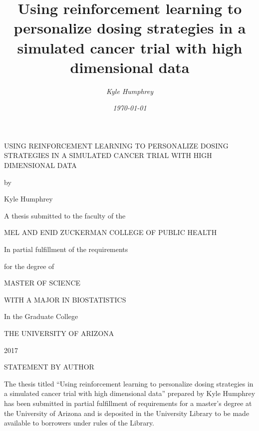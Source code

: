 \documentclass[12pt]{article}
\title{\normalfont \Large Using reinforcement learning to personalize dosing strategies in a simulated cancer trial with high dimensional data}
\author{\normalsize \sl Kyle Humphrey}
\date{\normalsize \sl \today}
\begin{document}
\begin{titlepage}
    \begin{center}
        \vspace*{1cm}
        
        \uppercase{Using reinforcement learning to personalize dosing strategies in a simulated cancer trial with high dimensional data}
        
        \vfill
        
        by
        
        \vfill
        
        Kyle Humphrey
        
        \vfill
        
        \underline{\kern 2in}
        
        \vfill
        
        A thesis submitted to the faculty of the

        \vfill
        
        \uppercase{Mel and Enid Zuckerman College of Public Health}
        
        \vfill
        
        In partial fulfillment of the requirements
        
        \bigskip
        
        for the degree of
        
        \vfill
        
        \uppercase{Master of Science}
        
        \medskip
        
        \uppercase{With a major in Biostatistics}
        
        \vfill
        
        In the Graduate College 
        
        \vfill
        
        \uppercase{The University of Arizona}
        
        \vfill
        
        2017
        
    \end{center}
\end{titlepage}

\begin{center}
STATEMENT BY AUTHOR
\end{center}

The thesis titled ``Using reinforcement learning to personalize dosing strategies in a simulated cancer trial with high dimensional data'' prepared by Kyle Humphrey has been submitted in partial fulfillment of requirements for a master’s degree at the University of Arizona and is deposited in the University Library to be made available to borrowers under rules of the Library.  
\end{document}
